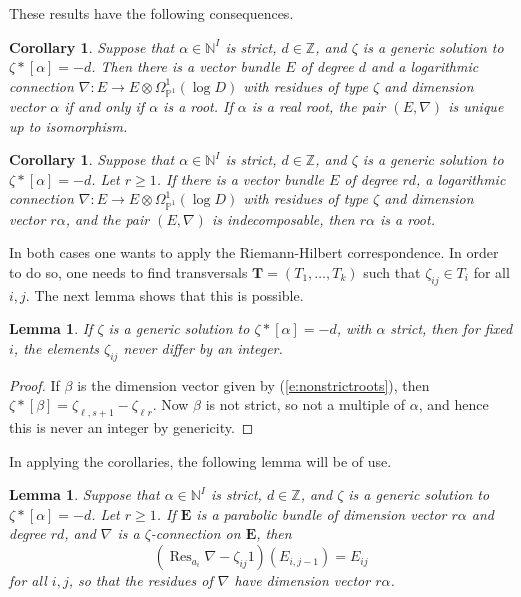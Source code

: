 \documentclass{amsart}
\theoremstyle{plain}
\newtheorem{lem}[thm]{Lemma}
\newtheorem{cor}[thm]{Corollary}
\theoremstyle{definition}
\theoremstyle{remark}
\newcommand{\Z}{\mathbb{Z}}
\newcommand{\N}{\mathbb{N}}
\newcommand{\PP}{\mathbb{P}}
\DeclareMathOperator{\Res}{Res}
\newcommand{\E}{\mathbf{E}}
\begin{document}
These results have the following consequences.


\begin{cor}\label{c:genconnroot}
Suppose that $\alpha\in\N^I$ is strict, $d\in\Z$, and
$\zeta$ is a generic solution to $\zeta*[\alpha]=-d$.
Then there is a vector bundle $E$ of degree $d$ and a logarithmic
connection $\nabla:E\to E\otimes \Omega^1_{\PP^1}(\log D)$
with residues of type $\zeta$ and dimension vector $\alpha$
if and only if $\alpha$ is a root. If $\alpha$ is a
real root, the pair $(E,\nabla)$ is unique up to isomorphism.
\end{cor}


\begin{cor}\label{c:genconnisroot}
Suppose that $\alpha\in\N^I$ is strict, $d\in\Z$, and
$\zeta$ is a generic solution to $\zeta*[\alpha]=-d$.
Let $r\ge 1$.
If there is a vector bundle $E$ of degree $rd$,
a logarithmic connection $\nabla:E\to E\otimes \Omega^1_{\PP^1}(\log D)$
with residues of type $\zeta$ and dimension vector $r\alpha$, and
the pair $(E,\nabla)$ is indecomposable, then $r\alpha$ is a root.
\end{cor}


In both cases one wants to apply the Riemann-Hilbert correspondence. In order to
do so, one needs to find transversals
$\mathbf{T}=(T_1,\dots,T_k)$ such that $\zeta_{ij}\in T_i$ for all $i,j$.
The next lemma shows that this is possible.


\begin{lem}
If $\zeta$ is a generic solution to $\zeta*[\alpha]=-d$, with $\alpha$ strict,
then for fixed $i$, the elements $\zeta_{ij}$ never differ by
an integer.
\end{lem}


\begin{proof}
If $\beta$ is the dimension vector given by (\ref{e:nonstrictroots}),
then $\zeta*[\beta] = \zeta_{\ell,s+1}-\zeta_{\ell r}$.
Now $\beta$ is not strict, so not a multiple of $\alpha$, and hence
this is never an integer by genericity.
\end{proof}


In applying the corollaries, the following lemma will be of use.


\begin{lem}\label{l:genstarconstrict}
Suppose that $\alpha\in\N^I$ is strict, $d\in\Z$, and
$\zeta$ is a generic solution to $\zeta*[\alpha]=-d$.
Let $r\ge 1$.
If $\E$ is a parabolic bundle of dimension vector $r\alpha$
and degree $rd$, and $\nabla$ is a $\zeta$-connection on $\E$,
then
\[
(\Res_{a_i}\nabla - \zeta_{ij}1)(E_{i,j-1}) = E_{ij}
\]
for all $i,j$, so that the residues of $\nabla$ have dimension vector $r\alpha$.
\end{lem}
\end{document}
